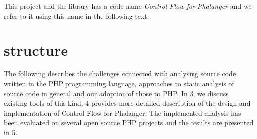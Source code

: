     This project and the library has a code name \emph{Control Flow for Phalanger} 
    and we refer to it using this name in the following text.
    
    \section{\wThesis{} structure}
    
    The following \wchapter{} describes the challenges connected with analysing source code 
    written in the PHP programming language, approaches to static analysis of 
    source code in general and our adoption of those to PHP. 
    In \wchapter{} 3, we discuss existing tools of this kind. 
    \wChapter{} 4 provides more detailed description of the design 
    and implementation of Control Flow for Phalanger. 
    The implemented analysis has been evaluated on several open source 
    PHP projects and the results are presented in \wchapter{} 5.
    